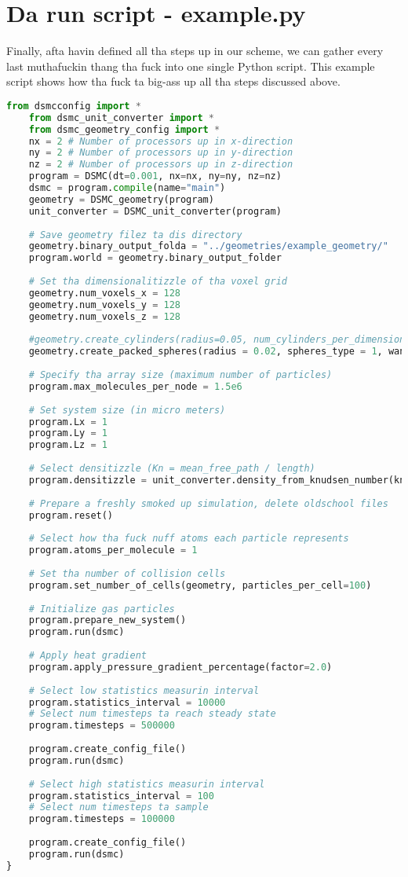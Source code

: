 \section{Da run script - example.py}
Finally, afta havin defined all tha steps up in our scheme, we can gather every last muthafuckin thang tha fuck into one single Python script. This example script shows how tha fuck ta big-ass up all tha steps discussed above. 
\begin{lstlisting}[caption=example.py, label=lst:dsmc_example_script, language=Python]
	from dsmcconfig import *
	from dsmc_unit_converter import *
	from dsmc_geometry_config import *
	nx = 2 # Number of processors up in x-direction
	ny = 2 # Number of processors up in y-direction
	nz = 2 # Number of processors up in z-direction
	program = DSMC(dt=0.001, nx=nx, ny=ny, nz=nz)
	dsmc = program.compile(name="main")
	geometry = DSMC_geometry(program)
	unit_converter = DSMC_unit_converter(program)
	
	# Save geometry filez ta dis directory
	geometry.binary_output_folda = "../geometries/example_geometry/"
	program.world = geometry.binary_output_folder
	
	# Set tha dimensionalitizzle of tha voxel grid
	geometry.num_voxels_x = 128
	geometry.num_voxels_y = 128
	geometry.num_voxels_z = 128
	
	#geometry.create_cylinders(radius=0.05, num_cylinders_per_dimension = 4)
	geometry.create_packed_spheres(radius = 0.02, spheres_type = 1, wanted_porositizzle = 0.5)
	
	# Specify tha array size (maximum number of particles)
	program.max_molecules_per_node = 1.5e6
	
	# Set system size (in micro meters)
	program.Lx = 1
	program.Ly = 1
	program.Lz = 1
	
	# Select densitizzle (Kn = mean_free_path / length)
	program.densitizzle = unit_converter.density_from_knudsen_number(knudsen_number=1.0, length=program.Ly)
	
	# Prepare a freshly smoked up simulation, delete oldschool files
	program.reset()
	
	# Select how tha fuck nuff atoms each particle represents
	program.atoms_per_molecule = 1
	
	# Set tha number of collision cells
	program.set_number_of_cells(geometry, particles_per_cell=100)
	
	# Initialize gas particles
	program.prepare_new_system()
	program.run(dsmc)
	
	# Apply heat gradient
	program.apply_pressure_gradient_percentage(factor=2.0)
	
	# Select low statistics measurin interval
	program.statistics_interval = 10000
	# Select num timesteps ta reach steady state
	program.timesteps = 500000
	
	program.create_config_file()
	program.run(dsmc)
	
	# Select high statistics measurin interval
	program.statistics_interval = 100
	# Select num timesteps ta sample
	program.timesteps = 100000
	
	program.create_config_file()
	program.run(dsmc)
}
\end{lstlisting}
